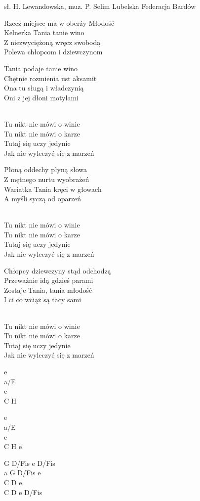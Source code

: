 {sł. H. Lewandowska, muz. P. Selim}
{Lubelska Federacja Bardów}
\begin{text}
Rzecz miejsce ma w oberży Młodość\\
Kelnerka Tania tanie wino\\
Z niezwyciężoną wręcz swobodą\\
Polewa chłopcom i dziewczynom

Tania podaje tanie wino\\
Chętnie rozmienia ust aksamit\\
Ona tu sługą i władczynią\\
Oni z jej dłoni motylami

\vin [2x]\\
\vin Tu nikt nie mówi o winie\\
\vin Tu nikt nie mówi o karze\\
\vin Tutaj się uczy jedynie\\
\vin Jak nie wyleczyć się z marzeń

Płoną oddechy płyną słowa\\
Z mętnego nurtu wyobrażeń\\
Wariatka Tania kręci w głowach\\
A myśli syczą od oparzeń

\vin [2x]\\
\vin Tu nikt nie mówi o winie\\
\vin Tu nikt nie mówi o karze\\
\vin Tutaj się uczy jedynie\\
\vin Jak nie wyleczyć się z marzeń

Chłopcy dziewczyny stąd odchodzą\\
Przeważnie idą gdzieś parami\\
Zostaje Tania, tania młodość\\
I ci co wciąż są tacy sami

\vin [2x]\\
\vin Tu nikt nie mówi o winie\\
\vin Tu nikt nie mówi o karze\\
\vin Tutaj się uczy jedynie\\
\vin Jak nie wyleczyć się z marzeń
\end{text}
\begin{chord}
e\\
a/E\\
e\\
C H

e\\
a/E\\
e\\
C H e

\hfill\break
G D/Fis e D/Fis\\
a G D/Fis e\\
C D e\\
C D e D/Fis
\end{chord}
